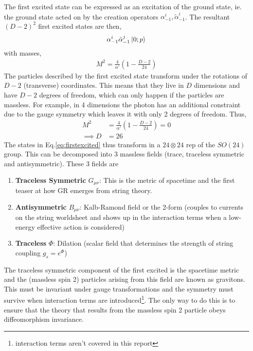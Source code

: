\documentclass{article}
\providecommand{\brak}[1]{\ensuremath{\left(#1\right)}} %
\begin{document}
\begin{enumerate}
    The first excited state can be expressed as an excitation of the ground state, ie. the ground state acted on by the creation operators $\alpha^i_{-1},\tilde{\alpha}^i_{-1}$. The resultant $(D-2)^2$ first excited states are then,
    \begin{align}
        \alpha^i_{-1}\tilde{\alpha}^j_{-1}\ket{0;p}\label{eq:firstexcited}
    \end{align}
    with masses,
    \begin{align}
        M^2 = \frac{4}{\alpha'}\brak{{1-\frac{D-2}{24}}}
    \end{align}
    The particles described by the first excited state transform under the rotations of $D-2$ (transverse) coordinates. This means that they live in $D$ dimensions and have $D-2$ degrees of freedom, which can only happen if the particles are massless. For example, in 4 dimensions the photon has an additional constraint due to the gauge symmetry which leaves it with only 2 degrees of freedom. Thus,
    \begin{align}
        M^2 &= \frac{4}{\alpha'}\brak{{1-\frac{D-2}{24}}}=0\\
        \implies D&=26
    \end{align}
    The states in Eq.\eqref{eq:firstexcited} thus transform in a $24\otimes24$ rep of the $SO(24)$ group. This can be decomposed into 3 massless fields (trace, traceless symmetric and antisymmetric). These 3 fields are
    \begin{enumerate}
        \item \textbf{Traceless Symmetric} $G_{\mu\nu}$: This is the metric of spacetime and the first teaser at how GR emerges from string theory.
        \item \textbf{Antisymmetric} $B_{\mu\nu}$: Kalb-Ramond field or the 2-form (couples to currents on the string worldsheet and shows up in the interaction terms when a low-energy effective action is considered)
        \item \textbf{Traceless} $\Phi$: Dilation (scalar field that determines the strength of string coupling $g_s=e^\Phi$)
    \end{enumerate}
\end{enumerate}
The traceless symmetric component of the first excited is the spacetime metric and the (massless spin 2) particles arising from this field are known as gravitons. This must be invariant under gauge transformations and the symmetry must survive when interaction terms are introduced\footnote{interaction terms aren't covered in this report}. The only way to do this is to ensure that the theory that results from the massless spin 2 particle obeys diffeomorphism invariance.\\
\end{document}
